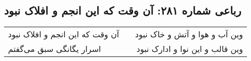 \begin{center}
\section*{رباعی شماره ۲۸۱: آن وقت که این انجم و افلاک نبود}
\label{sec:sh281}
\begin{longtable}{l p{0.5cm} r}
آن وقت که این انجم و افلاک نبود
&&
وین آب و هوا و آتش و خاک نبود
\\
اسرار یگانگی سبق می‌گفتم
&&
وین قالب و این نوا و ادارک نبود
\\
\end{longtable}
\end{center}
